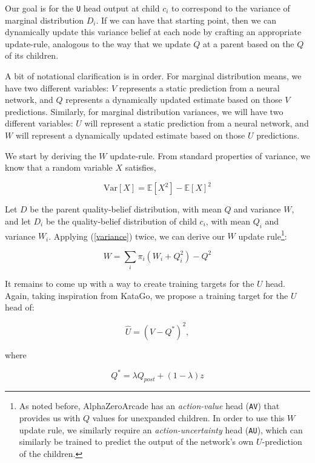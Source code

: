 \documentclass[tikz]{article}
\newcommand{\Var}{\mathrm{Var}}
\begin{document}
Our goal is for the \texttt{U} head output at child $c_i$ to correspond to the variance of marginal distribution $D_i$. If we can have
that starting point, then we can dynamically update this variance belief at each node by crafting an appropriate update-rule, analogous
to the way that we update $Q$ at a parent based on the $Q$ of its children. \newline

A bit of notational clarification is in order. For marginal distribution means, we have two different variables: $V$ represents a static prediction
from a neural network, and $Q$ represents a dynamically updated estimate based on those $V$ predictions. Similarly, for marginal distribution
variances, we will have two different variables: $U$ will represent a static prediction from a neural network, and $W$ will represent
a dynamically updated estimate based on those $U$ predictions. \newline

We start by deriving the $W$ update-rule. From standard properties of variance, we know that a random variable $X$ satisfies,

\begin{equation}
\label{variance}    
\Var[X] = \mathbb{E}[X^2] - \mathbb{E}[X]^2
\end{equation}

Let $D$ be the parent quality-belief distribution, with mean $Q$ and variance $W$, and let $D_i$ be the quality-belief distribution of
child $c_i$, with mean $Q_i$ and variance $W_i$. Applying (\ref{variance}) twice, we can derive our $W$ update rule\footnote{
As noted before, AlphaZeroArcade has an \emph{action-value} head (\texttt{AV}) that provides us with $Q$ values for unexpanded children.
In order to use this $W$ update rule, we similarly require an \emph{action-uncertainty} head (\texttt{AU}), which can similarly be
trained to predict the output of the network's own $U$-prediction of the children.}:

\begin{equation}
\label{W-update}    
W = \sum_{i} \pi_i (W_i + Q_i^2) - Q^2
\end{equation}

It remains to come up with a way to create training targets for the $U$ head. Again, taking inspiration from KataGo, we propose
a training target for the $U$ head of:

$$\hat{U} = (V - Q^*)^2,$$

where

$$Q^* = \lambda Q_{post} + (1-\lambda)z$$
\end{document}
